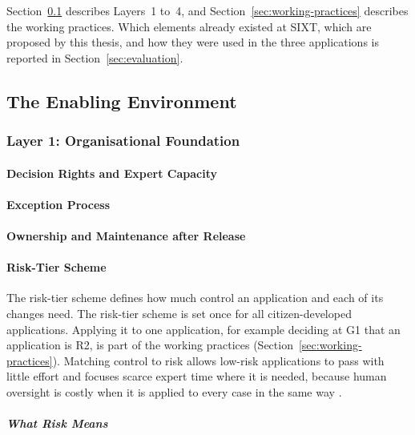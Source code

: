 \documentclass[10pt,a4paper]{article}
\begin{document}
Section~\ref{sec:enabling-environment} describes Layers~1 to~4, and
Section~\ref{sec:working-practices} describes the working practices.
Which elements already existed at SIXT, which are proposed by this
thesis, and how they were used in the three applications is reported in
Section~\ref{sec:evaluation}.

\subsection{The Enabling Environment}
\label{sec:enabling-environment}

\subsubsection{Layer 1: Organisational Foundation}
\label{sec:layer1}

\paragraph{Decision Rights and Expert Capacity}
\label{sec:decision-rights}

\paragraph{Exception Process}
\label{sec:exception-process}

\paragraph{Ownership and Maintenance after Release}
\label{sec:ownership}

\paragraph{Risk-Tier Scheme}
\label{sec:risk-tiers}

The risk-tier scheme defines how much control an application and each of
its changes need. The risk-tier scheme is set once for all citizen-developed applications.
Applying it to one application, for example deciding at G1 that an
application is R2, is part of the working practices
(Section~\ref{sec:working-practices}). Matching control to risk allows
low-risk applications to pass with little effort and focuses scarce
expert time where it is needed, because human oversight is costly when it
is applied to every case in the same way \parencite{kang2026}.

\subparagraph{What Risk Means}
\end{document}
